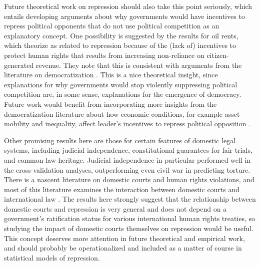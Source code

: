 \documentclass[12pt]{article}
\begin{document}
Future theoretical work on repression should also take this point seriously, which entails developing arguments about why governments would have incentives to repress political opponents that do not use political competition as an explanatory concept. One possibility is suggested by the results for oil rents, which \citet{DemerittYoung2013} theorize as related to repression because of the (lack of) incentives to protect human rights that results from increasing non-reliance on citizen-generated revenue. They note that this is consistent with arguments from the literature on democratization \citep[E.g.][]{Huntington1991,BDMSmith2009}. This is a nice theoretical insight, since explanations for why governments would stop violently suppressing political competition are, in some sense, explanations for the emergence of democracy. Future work would benefit from incorporating more insights from the democratization literature about how economic conditions, for example asset mobility and inequality, affect leader's incentives to repress political opposition \citep[See, e.g.][]{Boix2003,AcemogluRobinson2005,ClarkGolderGolder2013}. 

Other promising results here are those for certain features of domestic legal systems, including judicial independence, constitutional guarantees for fair trials, and common law heritage. Judicial independence in particular performed well in the cross-validation analyses, outperforming even civil war in predicting torture. There is a nascent literature on domestic courts and human rights violations, and most of this literature examines the interaction between domestic courts and international law \citep{Hathaway2007,PowellStaton2009,Simmons2009,Conrad2012,ConradRitter2013}. The results here strongly suggest that the relationship between domestic courts and repression is very general and does not depend on a government's ratification status for various international human rights treaties, so studying the impact of domestic courts themselves on repression would be useful. This concept deserves more attention in future theoretical and empirical work, and should probably be operationalized and included as a matter of course in statistical models of repression. 
\end{document}

